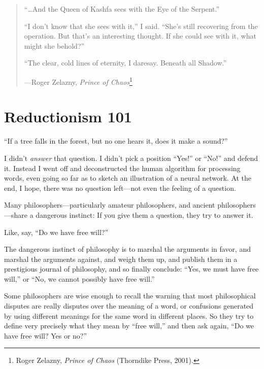 \begin{quotation}
{
 ``\ldots And the Queen of Kashfa sees with the Eye
of the Serpent.''}

{
 ``I don't know that she sees with
it,'' I said.
``She's still recovering from the
operation. But that's an interesting thought. If she
could see with it, what might she behold?''}

{
 ``The clear, cold lines of eternity, I daresay.
Beneath all Shadow.''}

{\raggedleft
 {}---Roger Zelazny, \textit{Prince of Chaos}\footnote{Roger Zelazny, \textit{Prince of Chaos} (Thorndike Press,
2001).}
\par}
\end{quotation}

\myendsectiontext


\chapter{Reductionism 101}


{
 ``If a tree falls in the forest, but no one hears
it, does it make a sound?'' }

{
 I didn't \textit{answer} that question. I
didn't pick a position
``Yes!'' or
``No!'' and defend it. Instead I
went off and deconstructed the human algorithm for processing words,
even going so far as to sketch an illustration of a neural network. At
the end, I hope, there was no question left---not even the feeling of a
question.}

{
 Many philosophers---particularly amateur philosophers, and ancient
philosophers---share a dangerous instinct: If you give them a question,
they try to answer it.}

{
 Like, say, ``Do we have free
will?''}

{
 The dangerous instinct of philosophy is to marshal the arguments
in favor, and marshal the arguments against, and weigh them up, and
publish them in a prestigious journal of philosophy, and so finally
conclude: ``Yes, we must have free
will,'' or ``No, we cannot possibly
have free will.''}

{
 Some philosophers are wise enough to recall the warning that most
philosophical disputes are really disputes over the meaning of a word,
or confusions generated by using different meanings for the same word
in different places. So they try to define very precisely what they
mean by ``free will,'' and then ask
again, ``Do we have free will? Yes or
no?''}

